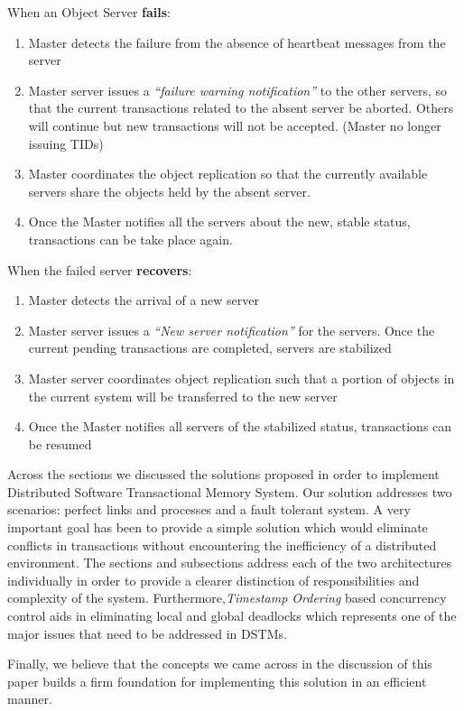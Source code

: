 \documentclass[times, 10pt,twocolumn]{article}
\begin{document}
When an Object Server {\bf fails}:
\begin{enumerate}
\item Master detects the failure from the absence of heartbeat messages from the server
\item Master server issues a {\it “failure warning notification”} to the other servers, so that the current transactions related to the absent server be aborted.
Others will continue but new transactions will not be accepted. (Master no longer issuing TIDs)
\item Master coordinates the object replication so that the currently available servers share the objects held by the absent server.
\item Once the Master notifies all the servers about the new, stable status, transactions can be take place again.\\
\end{enumerate}

When the failed server {\bf recovers}:
\begin{enumerate}
\item Master detects the arrival of a new server
\item Master server issues a {\it “New server notification”} for the servers. Once the current pending transactions are completed, servers are stabilized
\item Master server coordinates object replication such that a portion of objects in the current system will be transferred to the new server
\item Once the Master notifies all servers of the stabilized status, transactions can be resumed
\end{enumerate}

Across the sections we discussed the solutions proposed in order to implement Distributed Software Transactional Memory System.
Our solution addresses two scenarios: perfect links and processes and a fault tolerant system.
A very important goal has been to provide a simple solution which would eliminate conflicts in transactions without encountering the inefficiency of a distributed environment. 
The sections and subsections address each of the two architectures individually in order to provide a clearer distinction of responsibilities and complexity of the system.
Furthermore,{\it Timestamp Ordering} based concurrency control aids in eliminating local and global deadlocks which represents one of the major issues that need to be addressed in DSTMs.

Finally, we believe that the concepts we came across in the discussion of this paper builds a firm foundation for implementing this solution in an efficient manner.




\end{document}
